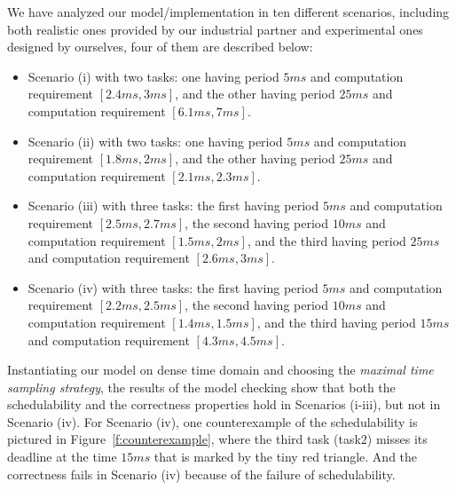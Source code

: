 \documentclass[10pt,journal,compsoc]{IEEEtran}
\begin{document}
We have analyzed our model/implementation in ten different scenarios,
including both realistic ones provided by our industrial partner and
experimental ones designed by ourselves, four of them are described
below:
\begin{itemize}
\item Scenario (i) with two tasks: one having period $5ms$ and
  computation requirement $[2.4ms, 3ms]$, and the other having period
  $25ms$ and computation requirement $[6.1ms, 7ms]$.
\item Scenario (ii) with two tasks: one having period $5ms$ and
  computation requirement $[1.8ms, 2ms]$, and the other having period
  $25ms$ and computation requirement $[2.1ms, 2.3ms]$.
\item Scenario (iii) with three tasks: the first having period $5ms$
  and computation requirement $[2.5ms, 2.7ms]$, the second having
  period $10ms$ and computation requirement $[1.5ms, 2ms]$, and the
  third having period $25ms$ and computation requirement $[2.6ms,
    3ms]$.
\item Scenario (iv) with three tasks: the first having period $5ms$
  and computation requirement $[2.2ms, 2.5ms]$, the second having
  period $10ms$ and computation requirement $[1.4ms, 1.5ms]$, and the
  third having period $15ms$ and computation requirement $[4.3ms,
    4.5ms]$.
\end{itemize}

Instantiating our model on dense time domain and choosing the
\emph{maximal time sampling strategy}, the results of the model
checking show that both the schedulability and the correctness
properties hold in Scenarios (i-iii), but not in Scenario (iv). For
Scenario (iv), one counterexample of the schedulability is pictured in
Figure~\ref{f:counterexample}, where the third task (task$2$) misses
its deadline at the time $15ms$ that is marked by the tiny red
triangle. And the correctness fails in Scenario (iv) because of the
failure of schedulability.
\end{document}
